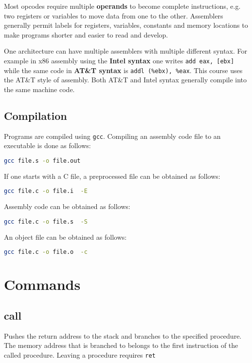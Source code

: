 \documentclass[reqno,a4paper,11pt]{amsart}
\begin{document}
Most opcodes require multiple \textbf{operands} to become complete
instructions, e.g. two registers or variables to move data from one to the
other. Assemblers generally permit labels for registers, variables, constants
and memory locations to make programs shorter and easier to read and
develop.

One architecture can have multiple assemblers with multiple different syntax.
For example in x86 assembly using the \textbf{Intel syntax} one writes
\texttt{add eax, [ebx]} while the same code in \textbf{AT\&T syntax} is
\texttt{addl (\%ebx), \%eax}. This course uses the AT\&T style of assembly. 
Both AT\&T and Intel syntax generally compile into the same machine code.

\subsection{Compilation}

Programs are compiled using \texttt{gcc}. Compiling an assembly code file to an
executable is done as follows:
\begin{lstlisting}[language=bash]
gcc file.s -o file.out
\end{lstlisting}
If one starts with a C file, a preprocessed file can be obtained as follows: 
\begin{lstlisting}[language=bash]
gcc file.c -o file.i  -E
\end{lstlisting}
Assembly code can be obtained as follows: 
\begin{lstlisting}[language=bash]
gcc file.c -o file.s  -S
\end{lstlisting}
An object file can be obtained as follows: 
\begin{lstlisting}[language=bash]
gcc file.c -o file.o  -c
\end{lstlisting}

\section{Commands}

\subsection{call}
Pushes the return address to the stack and branches to the specified procedure.
The memory address that is branched to belongs to the first instruction of the
called procedure. Leaving a procedure requires \texttt{ret}
\end{document}
